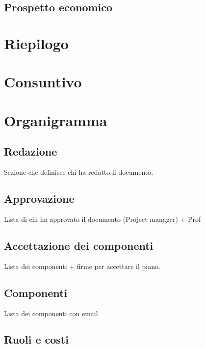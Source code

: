 \documentclass[12pt,a4paper]{article}
\begin{document}
\subsection{Prospetto economico}


\newpage
\section{Riepilogo}


\newpage
\section{Consuntivo}

\newpage
\appendix
\section{Organigramma}

\subsection{Redazione}
Sezione che definisce chi ha redatto il documento.

\subsection{Approvazione}
Lista di chi ha approvato il documento (Project manager) + Prof

\subsection{Accettazione dei componenti}
Lista dei componenti + firme per accettare il piano.

\subsection{Componenti}
Lista dei componenti con email

\subsection{Ruoli e costi}
\end{document}
